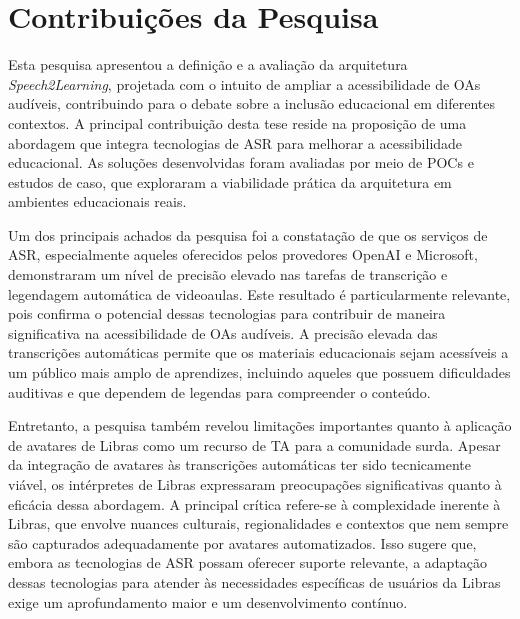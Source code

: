 

\section{Contribuições da Pesquisa}

Esta pesquisa apresentou a definição e a avaliação da arquitetura \textit{Speech2Learning}, projetada com o intuito de ampliar a acessibilidade de OAs audíveis, contribuindo para o debate sobre a inclusão educacional em diferentes contextos. A principal contribuição desta tese reside na proposição de uma abordagem que integra tecnologias de ASR para melhorar a acessibilidade educacional. As soluções desenvolvidas foram avaliadas por meio de POCs e estudos de caso, que exploraram a viabilidade prática da arquitetura em ambientes educacionais reais.

Um dos principais achados da pesquisa foi a constatação de que os serviços de ASR, especialmente aqueles oferecidos pelos provedores OpenAI e Microsoft, demonstraram um nível de precisão elevado nas tarefas de transcrição e legendagem automática de videoaulas. Este resultado é particularmente relevante, pois confirma o potencial dessas tecnologias para contribuir de maneira significativa na acessibilidade de OAs audíveis. A precisão elevada das transcrições automáticas permite que os materiais educacionais sejam acessíveis a um público mais amplo de aprendizes, incluindo aqueles que possuem dificuldades auditivas e que dependem de legendas para compreender o conteúdo.

Entretanto, a pesquisa também revelou limitações importantes quanto à aplicação de avatares de Libras como um recurso de TA para a comunidade surda. Apesar da integração de avatares às transcrições automáticas ter sido tecnicamente viável, os intérpretes de Libras expressaram preocupações significativas quanto à eficácia dessa abordagem. A principal crítica refere-se à complexidade inerente à Libras, que envolve nuances culturais, regionalidades e contextos que nem sempre são capturados adequadamente por avatares automatizados. Isso sugere que, embora as tecnologias de ASR possam oferecer suporte relevante, a adaptação dessas tecnologias para atender às necessidades específicas de usuários da Libras exige um aprofundamento maior e um desenvolvimento contínuo.

